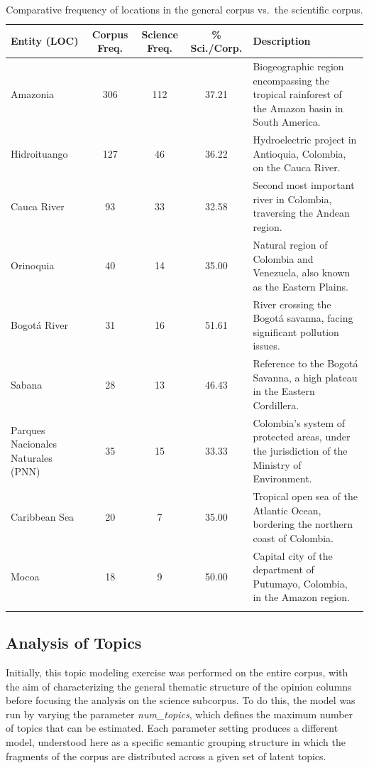 \documentclass[pdflatex,sn-mathphys-num,iicol]{sn-jnl}
\begin{document}
	\begin{table}[h!]
		\caption{Comparative frequency of locations in the general corpus vs.\ the scientific corpus.}
		\label{tab:ents_loc}
		{\footnotesize
			\begin{tabular}{@{}p{3cm}cccP{5.5cm}@{}}
				\toprule
				\textbf{Entity (LOC)} & \textbf{Corpus Freq.} & \textbf{Science Freq.} & \textbf{\% Sci./Corp.} & \textbf{Description} \\
				\midrule
				Amazonia & 306 & 112 & 37.21 & Biogeographic region encompassing the tropical rainforest of the Amazon basin in South America. \\
				Hidroituango & 127 & 46 & 36.22 & Hydroelectric project in Antioquia, Colombia, on the Cauca River. \\
				Cauca River & 93 & 33 & 32.58 & Second most important river in Colombia, traversing the Andean region. \\
				Orinoquia & 40 & 14 & 35.00 & Natural region of Colombia and Venezuela, also known as the Eastern Plains. \\
				Bogotá River & 31 & 16 & 51.61 & River crossing the Bogotá savanna, facing significant pollution issues. \\
				Sabana & 28 & 13 & 46.43 & Reference to the Bogotá Savanna, a high plateau in the Eastern Cordillera. \\
				Parques Nacionales Naturales (PNN) & 35 & 15 & 33.33 & Colombia's system of protected areas, under the jurisdiction of the Ministry of Environment. \\
				Caribbean Sea & 20 & 7 & 35.00 & Tropical open sea of the Atlantic Ocean, bordering the northern coast of Colombia. \\
				Mocoa & 18 & 9 & 50.00 & Capital city of the department of Putumayo, Colombia, in the Amazon region. \\
				\botrule
			\end{tabular}
		}
	\end{table}
	
	\subsection{Analysis of Topics}\label{subsec:topic_results}
	 
	
	Initially, this topic modeling exercise was performed on the entire corpus, with the aim of
	characterizing the general thematic structure of the opinion columns before focusing the analysis
	on the science subcorpus. To do this, the model was run by varying the parameter \textit{num\_topics},
	which defines the maximum number of topics that can be estimated. Each parameter setting
	produces a different model, understood here as a specific semantic grouping structure in which
	the fragments of the corpus are distributed across a given set of latent topics.
	
\end{document}

